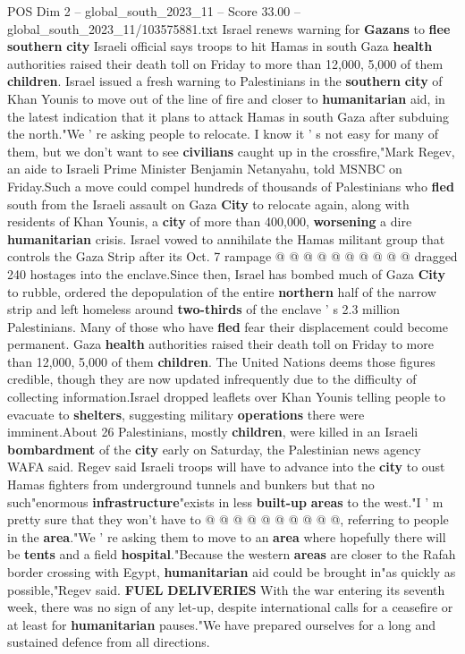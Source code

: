 \begin{textsample}{POS Dim 2 – global\_south\_2023\_11 – Score 33.00 – global\_south\_2023\_11/103575881.txt}  \label{ex:f2_pos_093}
Israel renews warning for \textbf{Gazans} to \textbf{flee} \textbf{southern} \textbf{city} Israeli official says troops to hit Hamas in south Gaza \textbf{health} authorities raised their death toll on Friday to more than 12,000, 5,000 of them \textbf{children}.
Israel issued a fresh warning to Palestinians in the \textbf{southern} \textbf{city} of Khan Younis to move out of the line of fire and closer to \textbf{humanitarian} aid, in the latest indication that it plans to attack Hamas in south Gaza after subduing the north."We ' re asking people to relocate.
I know it ' s not easy for many of them, but we don't want to see \textbf{civilians} caught up in the crossfire,"Mark Regev, an aide to Israeli Prime Minister Benjamin Netanyahu, told MSNBC on Friday.Such a move could compel hundreds of thousands of Palestinians who \textbf{fled} south from the Israeli assault on Gaza \textbf{City} to relocate again, along with residents of Khan Younis, a \textbf{city} of more than 400,000, \textbf{worsening} a dire \textbf{humanitarian} crisis.
Israel vowed to annihilate the Hamas militant group that controls the Gaza Strip after its Oct. 7 rampage @ @ @ @ @ @ @ @ @ @ dragged 240 hostages into the enclave.Since then, Israel has bombed much of Gaza \textbf{City} to rubble, ordered the depopulation of the entire \textbf{northern} half of the narrow strip and left homeless around \textbf{two-thirds} of the enclave ' s 2.3 million Palestinians.
Many of those who have \textbf{fled} fear their displacement could become permanent.
Gaza \textbf{health} authorities raised their death toll on Friday to more than 12,000, 5,000 of them \textbf{children}.
The United Nations deems those figures credible, though they are now updated infrequently due to the difficulty of collecting information.Israel dropped leaflets over Khan Younis telling people to evacuate to \textbf{shelters}, suggesting military \textbf{operations} there were imminent.About 26 Palestinians, mostly \textbf{children}, were killed in an Israeli \textbf{bombardment} of the \textbf{city} early on Saturday, the Palestinian news agency WAFA said.
Regev said Israeli troops will have to advance into the \textbf{city} to oust Hamas fighters from underground tunnels and bunkers but that no such"enormous \textbf{infrastructure}"exists in less \textbf{built-up} \textbf{areas} to the west."I ' m pretty sure that they won't have to @ @ @ @ @ @ @ @ @ @, referring to people in the \textbf{area}."We ' re asking them to move to an \textbf{area} where hopefully there will be \textbf{tents} and a field \textbf{hospital}."Because the western \textbf{areas} are closer to the Rafah border crossing with Egypt, \textbf{humanitarian} aid could be brought in"as quickly as possible,"Regev said. \textbf{FUEL} \textbf{DELIVERIES} With the war entering its seventh week, there was no sign of any let-up, despite international calls for a ceasefire or at least for \textbf{humanitarian} pauses."We have prepared ourselves for a long and sustained defence from all directions.

\end{textsample}
